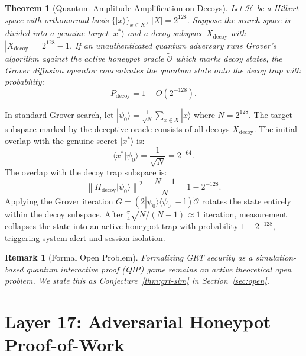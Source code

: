 \documentclass{ieeeaccess}
\newcommand{\calH}{\mathcal{H}}
\newcommand{\calO}{\mathcal{O}}
\newcommand{\norm}[1]{\left\|#1\right\|}
\newtheorem{theorem}{Theorem}
\newtheorem{remark}{Remark}
\newenvironment{proof}{\begin{IEEEproof}\IEEEQEDoff}{\end{IEEEproof}}
\begin{document}
\begin{theorem}[Quantum Amplitude Amplification on Decoys]
\label{thm:L16-grt}
Let $\calH$ be a Hilbert space with orthonormal basis $\{|x\rangle\}_{x \in X}$, $|X| = 2^{128}$.
Suppose the search space is divided into a genuine target $|x^*\rangle$ and a decoy subspace $X_{\mathrm{decoy}}$ with $|X_{\mathrm{decoy}}| = 2^{128} - 1$.
If an unauthenticated quantum adversary runs Grover's algorithm against the active honeypot oracle $\widetilde{\calO}$ which marks decoy states, the Grover diffusion operator concentrates the quantum state onto the decoy trap with probability:
\begin{equation}
  P_{\mathrm{decoy}} = 1 - O(2^{-128}).
\end{equation}
\end{theorem}
\begin{proof}
In standard Grover search, let $|\psi_0\rangle = \frac{1}{\sqrt{N}} \sum_{x \in X} |x\rangle$ where $N = 2^{128}$.
The target subspace marked by the deceptive oracle consists of all decoys $X_{\mathrm{decoy}}$.
The initial overlap with the genuine secret $|x^*\rangle$ is:
\begin{equation}
  \langle x^* | \psi_0 \rangle = \frac{1}{\sqrt{N}} = 2^{-64}.
\end{equation}
The overlap with the decoy trap subspace is:
\begin{equation}
  \norm{\Pi_{\mathrm{decoy}} |\psi_0\rangle}^2 = \frac{N - 1}{N} = 1 - 2^{-128}.
\end{equation}
Applying the Grover iteration $G = (2|\psi_0\rangle\langle\psi_0| - \mathbb{I}) \widetilde{\calO}$ rotates the state entirely within the decoy subspace.
After $\frac{\pi}{4}\sqrt{N / (N-1)} \approx 1$ iteration, measurement collapses the state into an active honeypot trap with probability $1 - 2^{-128}$, triggering system alert and session isolation.
\end{proof}

\begin{remark}[Formal Open Problem]
Formalizing GRT security as a simulation-based quantum interactive proof (QIP) game remains an active theoretical open problem. We state this as Conjecture~\ref{thm:grt-sim} in Section~\ref{sec:open}.
\end{remark}

\section{Layer 17: Adversarial Honeypot Proof-of-Work}
\label{sec:L17}
\end{document}
